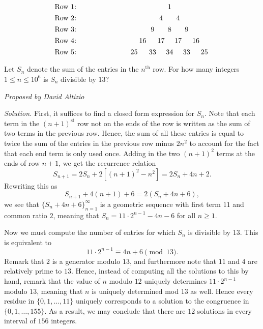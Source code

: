 \documentclass[10pt]{article}
\newcommand{\proposed}[1]
{
\vspace{5pt}
\noindent\textit{Proposed by #1}
}
\newcommand{\solution}
{
\vspace{5pt}
\noindent\textit{Solution.}\qquad
}
\begin{document}
\begin{enumerate}
\[\begin{array}{c@{\hspace{7em}}
c@{\hspace{2pt}}c@{\hspace{2pt}}c@{\hspace{4pt}}c@{\hspace{2pt}}
c@{\hspace{2pt}}c@{\hspace{2pt}}c@{\hspace{2pt}}c@{\hspace{3pt}}c@{\hspace{2pt}}
c@{\hspace{2pt}}c} \vspace{4pt}
\text{Row 1: } & & & & & & 1 & & & & & \\\vspace{4pt}
\text{Row 2: } & & & & & 4 & & 4 & & & & \\\vspace{4pt}
\text{Row 3: } & & & & 9 & & 8 & & 9 & & & \\\vspace{4pt}
\text{Row 4: } & & &16& &17& &17& & 16& & \\\vspace{4pt}
\text{Row 5: } & &25 & &33& &34 & &33 & &25 &
\end{array}\]
Let $S_n$ denote the sum of the entries in the $n^{\text{th}}$ row.  For how many integers $1\leq n\leq 10^6$ is $S_n$ divisible by $13$? %

\proposed{David Altizio}

\solution First, it suffices to find a closed form expression for $S_n$.  Note that each term in the $(n+1)^{\text{st}}$ row not on the ends of the row is written as the sum of two terms in the previous row.  Hence, the sum of all these entries is equal to twice the sum of the entries in the previous row minus $2n^2$ to account for the fact that each end term is only used once.  Adding in the two $(n+1)^2$ terms at the ends of row $n+1$, we get the recurrence relation \[S_{n+1}=2S_n+2[(n+1)^2-n^2] = 2S_n+4n+2.\] Rewriting this as \[S_{n+1}+4(n+1)+6=2(S_n+4n+6),\] we see that $\{S_n+4n+6\}_{n=1}^\infty$ is a geometric sequence with first term $11$ and common ratio $2$, meaning that $S_n=11\cdot 2^{n-1}-4n-6$ for all $n\geq 1$.

\par Now we must compute the number of entries for which $S_n$ is divisible by $13$.  This is equivalent to \[11\cdot 2^{n-1}\equiv 4n+6\pmod{13}.\] Remark that $2$ is a generator modulo $13$, and furthermore note that $11$ and $4$ are relatively prime to $13$.  Hence, instead of computing all the solutions to this by hand, remark that the value of $n$ modulo $12$ uniquely determines $11\cdot 2^{n-1}$ modulo $13$, meaning that $n$ is uniquely determined mod 13 as well.  Hence every residue in $\{0,1,\ldots, 11\}$ uniquely corresponds to a solution to the congruence in $\{0,1,\ldots, 155\}$.  As a result, we may conclude that there are $12$ solutions in every interval of $156$ integers.


\end{enumerate}
\end{document}
